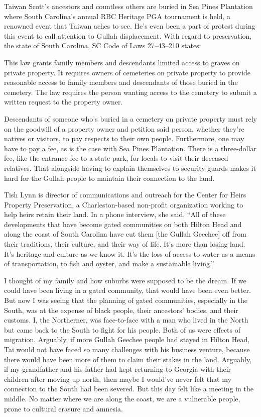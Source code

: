 Taiwan Scott's ancestors and countless others are buried in Sea Pines
Plantation where South Carolina's annual RBC Heritage PGA tournament is
held, a renowned event that Taiwan aches to see. He's even been a part
of protest during this event to call attention to Gullah displacement.
With regard to preservation, the state of South Carolina, SC Code of
Laws 27--43--210 states:

This law grants family members and descendants limited access to graves
on private property. It requires owners of cemeteries on private
property to provide reasonable access to family members and descendants
of those buried in the cemetery. The law requires the person wanting
access to the cemetery to submit a written request to the property
owner.

Descendants of someone who's buried in a cemetery on private property
must rely on the goodwill of a property owner and petition said person,
whether they're natives or visitors, to pay respects to their own
people. Furthermore, one may have to pay a fee, as is the case with Sea
Pines Plantation. There is a three-dollar fee, like the entrance fee to
a state park, for locals to visit their deceased relatives. That
alongside having to explain themselves to security guards makes it hard
for the Gullah people to maintain their connection to the land.

Tish Lynn is director of communications and outreach for the Center for
Heirs Property Preservation, a Charleston-based non-profit organization
working to help heirs retain their land. In a phone interview, she said,
``All of these developments that have become gated communities on both
Hilton Head and along the coast of South Carolina have cut them {[}the
Gullah Geechee{]} off from their traditions, their culture, and their
way of life. It's more than losing land. It's heritage and culture as we
know it. It's the loss of access to water as a means of transportation,
to fish and oyster, and make a sustainable living.''

I thought of my family and how suburbs were supposed to be the dream. If
we could have been living in a gated community, that would have been
even better. But now I was seeing that the planning of gated
communities, especially in the South, was at the expense of black
people, their ancestors' bodies, and their customs. I, the Northerner,
was face-to-face with a man who lived in the North but came back to the
South to fight for his people. Both of us were effects of migration.
Arguably, if more Gullah Geechee people had stayed in Hilton Head, Tai
would not have faced so many challenges with his business venture,
because there would have been more of them to claim their stakes in the
land. Arguably, if my grandfather and his father had kept returning to
Georgia with their children after moving up north, then maybe I would've
never felt that my connection to the South had been severed. But this
day felt like a meeting in the middle. No matter where we are along the
coast, we are a vulnerable people, prone to cultural erasure and
amnesia.

